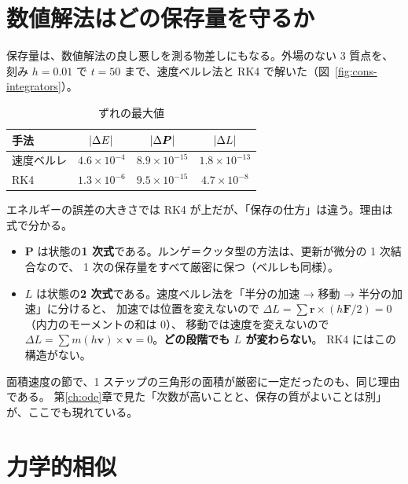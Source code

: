 \section{数値解法はどの保存量を守るか}\label{sec:cons-integrators}

保存量は、数値解法の良し悪しを測る物差しにもなる。外場のない 3 質点を、刻み $h=0.01$ で
$t=50$ まで、速度ベルレ法と RK4 で解いた（図~\ref{fig:cons-integrators}）。


\begin{table}[htbp]
\centering
\caption{ずれの最大値}\label{tab:integrators}
\begin{tabular}{lccc}
\toprule
手法 & $\left\lvert \Delta E\right\rvert$ & $\left\lvert \Delta\bm P\right\rvert$ & $\left\lvert \Delta L\right\rvert$ \\
\midrule
速度ベルレ & $4.6\times10^{-4}$ & $8.9\times10^{-15}$ & $1.8\times10^{-13}$ \\
RK4        & $1.3\times10^{-6}$ & $9.5\times10^{-15}$ & $4.7\times10^{-8}$ \\
\bottomrule
\end{tabular}
\end{table}

エネルギーの誤差の大きさでは RK4 が上だが、「保存の仕方」は違う。理由は式で分かる。
\begin{itemize}
  \item $\bm P$ は状態の\textbf{1 次式}である。ルンゲ＝クッタ型の方法は、更新が微分の 1 次結合なので、
    1 次の保存量をすべて厳密に保つ（ベルレも同様）。
  \item $L$ は状態の\textbf{2 次式}である。速度ベルレ法を「半分の加速 → 移動 → 半分の加速」に分けると、
    加速では位置を変えないので $\Delta L=\sum\bm r\times(h\bm F/2)=0$（内力のモーメントの和は 0）、
    移動では速度を変えないので $\Delta L=\sum m(h\bm v)\times\bm v=0$。\textbf{どの段階でも $L$ が変わらない}。
    RK4 にはこの構造がない。
\end{itemize}
面積速度の節で、1 ステップの三角形の面積が厳密に一定だったのも、同じ理由である。
第\ref{ch:ode}章で見た「次数が高いことと、保存の質がよいことは別」が、ここでも現れている。

\section{力学的相似}\label{sec:similarity}

